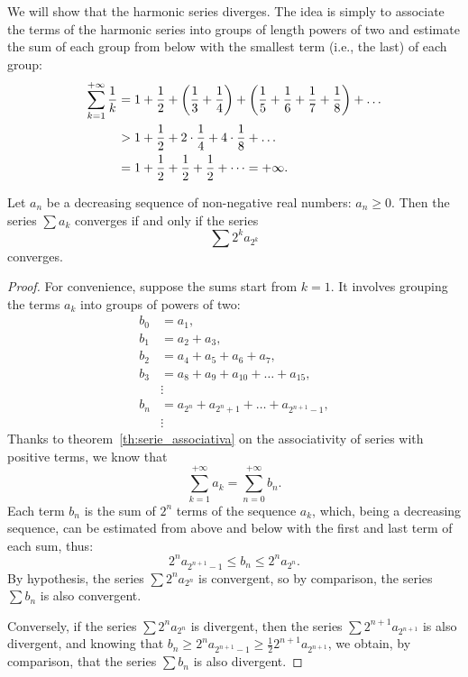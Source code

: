 We will show that the harmonic series diverges.
The idea is simply to associate the terms of the harmonic series into groups of
length powers of two and estimate the sum of each group from below with the
smallest term (i.e., the last) of each group:
\begin{align*}
 \sum_{k=1}^{+\infty} \frac{1}{k}
 & = 1 + \frac 1 2
     + {\left( \frac 1 3 + \frac 1 4 \right)}
     + {\left( \frac 1 5 + \frac 1 6 + \frac 1 7 + \frac 1 8 \right)}
     + \dots\\
 & > 1 + \frac 1 2 + 2 \cdot \frac 1 4 + 4 \cdot \frac 1 8 + \dots \\
   & = 1 + \frac 1 2 + \frac 1 2 + \frac 1 2 + \dots
    = +\infty.
\end{align*}

\begin{theorem}%
\label{th:condensazione}%
\mymark{**}%
%
%
%
%
Let $a_n$ be a decreasing sequence of non-negative real numbers: $a_n \ge 0$.
Then the series $\sum a_k$ converges if and only if the series
\[
  \sum 2^k a_{2^k}
\]
converges.
\end{theorem}
%
\begin{proof}
\mymark{**}
For convenience, suppose the sums start from $k=1$.
It involves grouping the terms $a_k$ into groups of powers of two:
\begin{align*}
  b_0 & = a_1, \\
  b_1 &= a_2 +  a_3, \\
  b_2 &= a_4 +  a_5 +  a_6 +  a_7, \\
  b_3 &= a_8 +  a_9 +  a_{10} + \dots + a_{15}, \\
  &\vdots\\
  b_n &= a_{2^n} +  a_{2^{n}+1} + \dots + a_{2^{n+1}-1},\\
  &\vdots
\end{align*}
Thanks to theorem~\ref{th:serie_associativa} on the associativity of series with
positive terms, we know that
  \[
  \sum_{k=1}^{+\infty} a_k = \sum_{n=0}^{+\infty} b_n.
  \]
Each term $b_n$ is the sum of $2^n$ terms of the sequence $a_k$, which, being a
decreasing sequence, can be estimated from above and below with the first and
last term of each sum, thus:
\[
  2^n a_{2^{n+1}-1} \le b_n \le 2^n a_{2^{n}}.
\]
By hypothesis, the series $\sum 2^n a_{2^n}$ is convergent, so by comparison,
the series $\sum b_n$ is also convergent.

Conversely, if the series $\sum 2^n a_{2^n}$ is divergent, then the series $\sum
2^{n+1} a_{2^{n+1}}$ is also divergent, and knowing that $b_n\ge 2^n
a_{2^{n+1}-1}\ge \frac 1 2 2^{n+1} a_{2^{n+1}}$, we obtain, by comparison, that
the series $\sum b_n$ is also divergent.
\end{proof}


